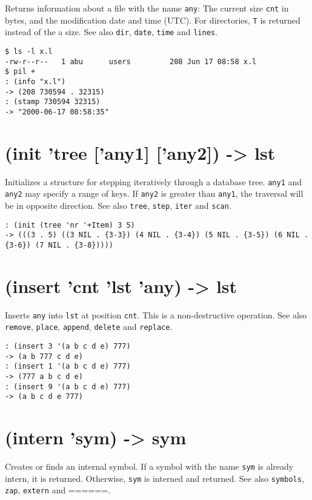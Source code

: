{{{{{{Returns information about a file with the name \texttt{any}: The current size
\texttt{cnt} in bytes, and the modification date and time (UTC). For
directories, \texttt{T} is returned instead of the a size. See also \texttt{dir},
\texttt{date}, \texttt{time} and \texttt{lines}.


\begin{verbatim}
$ ls -l x.l
-rw-r--r--   1 abu      users         208 Jun 17 08:58 x.l
$ pil +
: (info "x.l")
-> (208 730594 . 32315)
: (stamp 730594 32315)
-> "2000-06-17 08:58:35"
\end{verbatim}

 
\section{(init 'tree ['any1] ['any2]) -> lst}
\label{sec-8-1-9-14}


Initializes a structure for stepping iteratively through a database
tree. \texttt{any1} and \texttt{any2} may specify a range of keys. If \texttt{any2} is
greater than \texttt{any1}, the traversal will be in opposite direction. See
also \texttt{tree}, \texttt{step}, \texttt{iter} and \texttt{scan}.


\begin{verbatim}
: (init (tree 'nr '+Item) 3 5)
-> (((3 . 5) ((3 NIL . {3-3}) (4 NIL . {3-4}) (5 NIL . {3-5}) (6 NIL . {3-6}) (7 NIL . {3-8}))))
\end{verbatim}

 
\section{(insert 'cnt 'lst 'any) -> lst}
\label{sec-8-1-9-15}


Inserts \texttt{any} into \texttt{lst} at position \texttt{cnt}. This is a non-destructive
operation. See also \texttt{remove}, \texttt{place}, \texttt{append}, \texttt{delete} and \texttt{replace}.


\begin{verbatim}
: (insert 3 '(a b c d e) 777)
-> (a b 777 c d e)
: (insert 1 '(a b c d e) 777)
-> (777 a b c d e)
: (insert 9 '(a b c d e) 777)
-> (a b c d e 777)
\end{verbatim}

 
\section{(intern 'sym) -> sym}
\label{sec-8-1-9-16}


Creates or finds an internal symbol. If a symbol with the name \texttt{sym} is
already intern, it is returned. Otherwise, \texttt{sym} is interned and
returned. See also \texttt{symbols}, \texttt{zap}, \texttt{extern} and ======.


}}}}}}
